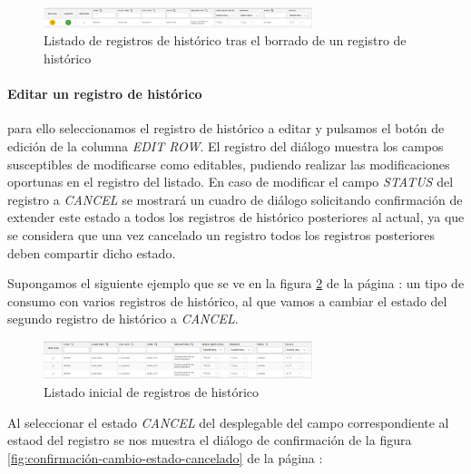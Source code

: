 \begin{figure}[H]
  \centering
  \includegraphics[width=0.70\textwidth]{imaxes/listado-historico-tipo-consumo-tras-borrar.png}
  \caption{Listado de registros de histórico tras el borrado de un registro de histórico}
  \label{fig:listado-historico-tipo-consumo-tras-borrar}
\end{figure}




\paragraph{Editar un registro de histórico} para ello seleccionamos el registro de histórico a editar y pulsamos el botón de edición de la columna \emph{EDIT ROW}. El registro del diálogo muestra los campos susceptibles de modificarse como editables, pudiendo realizar las modificaciones oportunas en el registro del listado. En caso de modificar el campo \emph{STATUS} del registro a \emph{CANCEL} se mostrará un cuadro de diálogo solicitando confirmación de extender este estado a todos los registros de histórico posteriores al actual, ya que se considera que una vez cancelado un registro todos los registros posteriores deben compartir dicho estado.

Supongamos el siguiente ejemplo que se ve en la figura \ref{fig:listado-tipos-cuotas-inicial} de la página \pageref{fig:listado-tipos-cuotas-inicial}: un tipo de consumo con varios registros de histórico, al que vamos a cambiar el estado del segundo registro de histórico a \emph{CANCEL}.

\begin{figure}[H]
  \centering
  \includegraphics[width=0.70\textwidth]{imaxes/listado-tipos-cuotas-inicial.png}
  \caption{Listado inicial de registros de histórico}
  \label{fig:listado-tipos-cuotas-inicial}
\end{figure}


Al seleccionar el estado \emph{CANCEL} del desplegable del campo correspondiente al estaod del registro se nos muestra el diálogo de confirmación de la figura \ref{fig:confirmación-cambio-estado-cancelado} de la página \pageref{fig:confirmación-cambio-estado-cancelado}:

